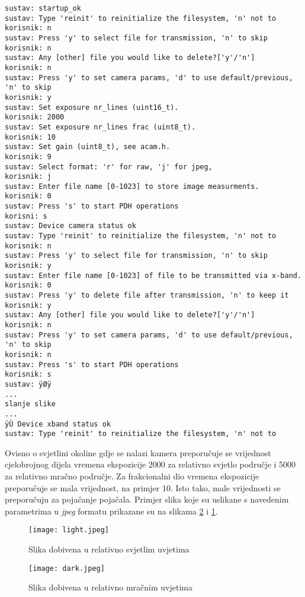 \begin{minipage}{\linewidth}
\begin{lstlisting}[basicstyle=\tiny\ttfamily, caption=Komunikacija između računala i PDH sustava, label={lst:default_comms}]
sustav: startup_ok
sustav: Type 'reinit' to reinitialize the filesystem, 'n' not to
korisnik: n
sustav: Press 'y' to select file for transmission, 'n' to skip
korisnik: n
sustav: Any [other] file you would like to delete?['y'/'n']
korisnik: n
sustav: Press 'y' to set camera params, 'd' to use default/previous, 'n' to skip
korisnik: y
sustav: Set exposure nr_lines (uint16_t).
korisnik: 2000
sustav: Set exposure nr_lines frac (uint8_t).
korisnik: 10
sustav: Set gain (uint8_t), see acam.h.
korisnik: 9
sustav: Select format: 'r' for raw, 'j' for jpeg,
korisnik: j
sustav: Enter file name [0-1023] to store image measurments.
korisnik: 0
sustav: Press 's' to start PDH operations
korisni: s
sustav: Device camera status ok
sustav: Type 'reinit' to reinitialize the filesystem, 'n' not to
korisnik: n
sustav: Press 'y' to select file for transmission, 'n' to skip
korisnik: y
sustav: Enter file name [0-1023] of file to be transmitted via x-band.
korisnik: 0
sustav: Press 'y' to delete file after transmission, 'n' to keep it
korisnik: y
sustav: Any [other] file you would like to delete?['y'/'n']
korisnik: n
sustav: Press 'y' to set camera params, 'd' to use default/previous, 'n' to skip
korisnik: n
sustav: Press 's' to start PDH operations
korisnik: s
sustav: ÿØÿ
...
slanje slike
...
ÿÙ Device xband status ok
sustav: Type 'reinit' to reinitialize the filesystem, 'n' not to
\end{lstlisting}
\end{minipage}

Ovisno o svjetlini okoline gdje se nalazi kamera preporučuje se vrijednost cjelobrojnog dijela vremena ekspozicije 2000 za relativno svjetlo područje i 5000 za relativno mračno područje. Za frakcionalni dio vremena ekspozicije preporučuje se mala vrijednost, na primjer 10. Isto tako, male vrijednosti se preporučuju za pojačanje pojačala. Primjer slika koje su uslikane s navedenim parametrima u \textit{jpeg} formatu prikazane su na slikama \ref{fig:dark} i \ref{fig:light}.
\begin{figure}[H]
	\centering
	\texttt{[image: light.jpeg]}
	\caption{Slika dobivena u relativno svjetlim uvjetima}
	\label{fig:light}
\end{figure}
\begin{figure}[H]
	\centering
	\texttt{[image: dark.jpeg]}
	\caption{Slika dobivena u relativno mračnim uvjetima}
	\label{fig:dark}
\end{figure}